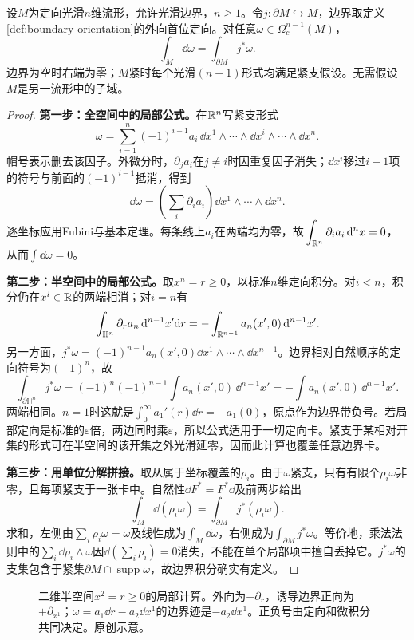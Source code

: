 \begin{theorem}[紧支Stokes定理]\label{thm:stokes}
设$M$为定向光滑$n$维流形，允许光滑边界，$n\geq1$。令$j:\partial M\hookrightarrow M$，边界取定义\ref{def:boundary-orientation}的外向首位定向。对任意$\omega\in\Omega_c^{n-1}(M)$，
\[
 \int_M\dd\omega=\int_{\partial M}j^*\omega.
\]
边界为空时右端为零；$M$紧时每个光滑$(n-1)$形式均满足紧支假设。无需假设$M$是另一流形中的子域。
\end{theorem}
\begin{proof}
\textbf{第一步：全空间中的局部公式。}在$\mathbb{R}^n$写紧支形式
\[
 \omega=\sum_{i=1}^n(-1)^{i-1}a_i\,
 \dd x^1\wedge\cdots\wedge\widehat{\dd x^i}\wedge\cdots\wedge\dd x^n.
\]
帽号表示删去该因子。外微分时，$\partial_j a_i$在$j\ne i$时因重复因子消失；$\dd x^i$移过$i-1$项的符号与前面的$(-1)^{i-1}$抵消，得到
\[
 \dd\omega=\left(\sum_i\partial_i a_i\right)\dd x^1\wedge\cdots\wedge\dd x^n.
\]
逐坐标应用Fubini与基本定理。每条线上$a_i$在两端均为零，故$\int_{\R^n}\partial_i a_i\,\dd^n x=0$，从而$\int\dd\omega=0$。

\textbf{第二步：半空间中的局部公式。}取$x^n=r\geq0$，以标准$n$维定向积分。对$i<n$，积分仍在$x^i\in\mathbb{R}$的两端相消；对$i=n$有
\[
 \int_{\mathbb H^n}\partial_r a_n\,\dd^{n-1}x'\dd r
 =-\int_{\R^{n-1}}a_n(x',0)\,\dd^{n-1}x'.
\]
另一方面，$j^*\omega=(-1)^{n-1}a_n(x',0)\dd x^1\wedge\cdots\wedge\dd x^{n-1}$。边界相对自然顺序的定向符号为$(-1)^n$，故
\[
 \int_{\partial\mathbb H^n}j^*\omega
 =(-1)^n(-1)^{n-1}\int a_n(x',0)\,\dd^{n-1}x'
 =-\int a_n(x',0)\,\dd^{n-1}x'.
\]
两端相同。$n=1$时这就是$\int_0^\infty a_1'(r)\dd r=-a_1(0)$，原点作为边界带负号。若局部定向是标准的$\varepsilon$倍，两边同时乘$\varepsilon$，所以公式适用于一切定向卡。紧支于某相对开集的形式可在半空间的该开集之外光滑延零，因而此计算也覆盖任意边界卡。

\textbf{第三步：用单位分解拼接。}取从属于坐标覆盖的$\rho_i$。由于$\omega$紧支，只有有限个$\rho_i\omega$非零，且每项紧支于一张卡中。自然性$\dd F^*=F^*\dd$及前两步给出
\[
 \int_M\dd(\rho_i\omega)=\int_{\partial M}j^*(\rho_i\omega).
\]
求和，左侧由$\sum_i\rho_i\omega=\omega$及线性成为$\int_M\dd\omega$，右侧成为$\int_{\partial M}j^*\omega$。等价地，乘法法则中的$\sum_i\dd\rho_i\wedge\omega$因$\dd(\sum_i\rho_i)=0$消失，不能在单个局部项中擅自丢掉它。$j^*\omega$的支集包含于紧集$\partial M\cap\operatorname{supp}\omega$，故边界积分确实有定义。
\end{proof}

\begin{figure}[htbp]
\centering
\caption{二维半空间$x^2=r\geq0$的局部计算。外向为$-\partial_r$，诱导边界正向为$+\partial_{x^1}$；$\omega=a_1\dd r-a_2\dd x^1$的边界迹是$-a_2\dd x^1$。正负号由定向和微积分共同决定。原创示意。}
\label{fig:stokes-halfspace}
\end{figure}

